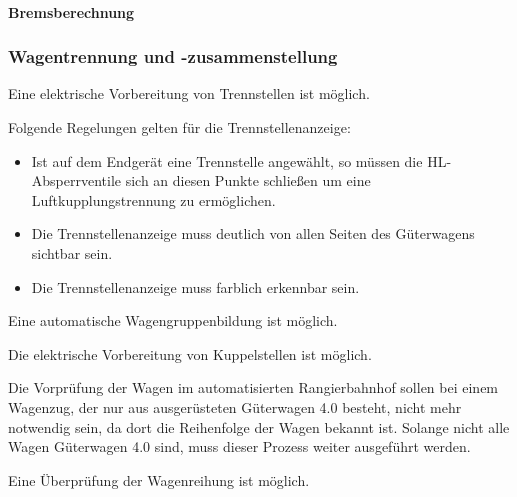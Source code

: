 \paragraph{Bremsberechnung}


\subsubsection{Wagentrennung und -zusammenstellung}
\begin{feat}
Eine elektrische Vorbereitung von Trennstellen ist möglich.
\end{feat}
\begin{rem} [zu Anf. 51]
Folgende Regelungen gelten für die Trennstellenanzeige:
\begin{itemize}
    \item Ist auf dem Endgerät eine Trennstelle angewählt, so müssen die \acrshort{HL}-Absperrventile sich an diesen Punkte schließen um eine Luftkupplungstrennung zu ermöglichen.
    \item Die Trennstellenanzeige muss deutlich von allen Seiten des Güterwagens sichtbar sein.
    \item Die Trennstellenanzeige muss farblich erkennbar sein.
\end{itemize}
\end{rem}
\begin{feat}
Eine automatische Wagengruppenbildung ist möglich.
\end{feat}
\begin{feat}
Die elektrische Vorbereitung von Kuppelstellen ist möglich.
\end{feat}
Die Vorprüfung der Wagen im automatisierten Rangierbahnhof sollen bei einem Wagenzug, der nur aus ausgerüsteten Güterwagen 4.0 besteht, nicht mehr notwendig sein, da dort die Reihenfolge der Wagen bekannt ist. Solange nicht alle Wagen Güterwagen 4.0 sind, muss dieser Prozess weiter ausgeführt werden.
\begin{feat}
Eine Überprüfung der Wagenreihung ist möglich.
\end{feat}
